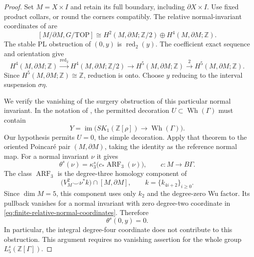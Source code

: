 \begin{proof}
Set $M=X\times I$ and retain its full boundary, including
$\partial X\times I$.  Use fixed product collars, or round
the corners compatibly.  The relative normal-invariant
coordinates of
\cite[Lemmas~4.8--4.9, p.~2526]{Galvin2026CassonSullivan}
are
\begin{equation}\label{eq:finite-relative-normal-coordinates}
 [M/\partial M,G/\mathrm{TOP}]
 \cong H^2(M,\partial M;\mathbb Z/2)
                \oplus H^4(M,\partial M;\mathbb Z).
\end{equation}
The stable PL obstruction of $(0,y)$ is
$\operatorname{red}_2(y)$.  The coefficient exact sequence and
orientation give
\[
 H^4(M,\partial M;\mathbb Z)
 \xrightarrow{\operatorname{red}_2}
 H^4(M,\partial M;\mathbb Z/2)\longrightarrow
 H^5(M,\partial M;\mathbb Z)
 \xrightarrow{\,2\,}H^5(M,\partial M;\mathbb Z).
\]
Since $H^5(M,\partial M;\mathbb Z)\cong\mathbb Z$,
reduction is onto.  Choose $y$ reducing to the interval
suspension $\sigma\eta$.

We verify the vanishing of the surgery obstruction of this
particular normal invariant.  In the notation of
\cite[Theorem~A(b) and Definition~(0.6), p.~351]
{HambletonMilgramTaylorWilliams1988}, the permitted decoration
$U\subset\operatorname{Wh}(\Gamma)$ must contain
\[
 Y=\operatorname{im}\bigl(SK_1(\mathbb Z[\rho])
                       \longrightarrow\operatorname{Wh}(\Gamma)\bigr).
\]
Our hypothesis permits $U=0$, the simple decoration.
Apply that theorem to the oriented Poincar\'e pair
$(M,\partial M)$, taking the identity as the reference normal
map.  For a normal invariant $\nu$ it gives
\begin{equation}\label{eq:finite-five-dimensional-surgery-formula}
 \theta^s(\nu)=\kappa_3^s\bigl(c_*
                         \operatorname{ARF}_3(\nu)\bigr),
 \qquad c:M\longrightarrow B\Gamma.
\end{equation}
The class $\operatorname{ARF}_3$ is the degree-three homology
component of
\[
       \bigl(V_M^2\smile\nu^*k\bigr)\cap[M,\partial M],
       \qquad k=\{k_{4i+2}\}_{i\geq0}.
\]
Since $\dim M=5$, this component uses only $k_2$ and the
degree-zero Wu factor.  Its pullback vanishes for a normal
invariant with zero degree-two coordinate in
\eqref{eq:finite-relative-normal-coordinates}.  Therefore
\begin{equation}\label{eq:finite-zero-arf-realization}
                  \theta^s(0,y)=0.
\end{equation}
In particular, the integral degree-four coordinate does not
contribute to this obstruction.  This argument requires no
vanishing assertion for the whole group $L_5^s(\mathbb Z[\Gamma])$.


\end{proof}
